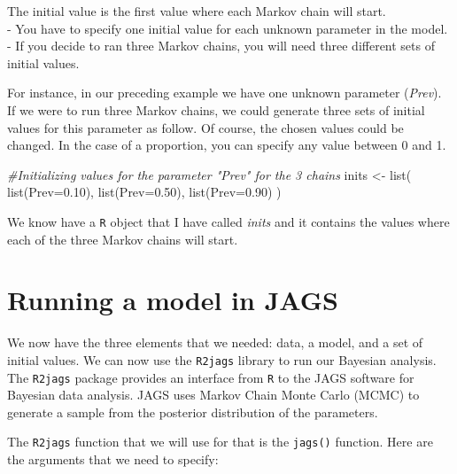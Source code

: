 \documentclass[
]{book}
\newenvironment{Shaded}{\begin{snugshade}}{\end{snugshade}}
\newcommand{\AttributeTok}[1]{\textcolor[rgb]{0.77,0.63,0.00}{#1}}
\newcommand{\CommentTok}[1]{\textcolor[rgb]{0.56,0.35,0.01}{\textit{#1}}}
\newcommand{\FloatTok}[1]{\textcolor[rgb]{0.00,0.00,0.81}{#1}}
\newcommand{\FunctionTok}[1]{\textcolor[rgb]{0.00,0.00,0.00}{#1}}
\newcommand{\NormalTok}[1]{#1}
\newcommand{\OtherTok}[1]{\textcolor[rgb]{0.56,0.35,0.01}{#1}}
\begin{document}
The initial value is the first value where each Markov chain will
start.\\
- You have to specify one initial value for each unknown parameter in
the model.\\
- If you decide to ran three Markov chains, you will need three
different sets of initial values.

For instance, in our preceding example we have one unknown parameter
(\emph{Prev}). If we were to run three Markov chains, we could generate
three sets of initial values for this parameter as follow. Of course,
the chosen values could be changed. In the case of a proportion, you can
specify any value between 0 and 1.

\begin{Shaded}
\begin{Highlighting}[]
\CommentTok{\#Initializing values for the parameter "Prev" for the 3 chains}
\NormalTok{inits }\OtherTok{\textless{}{-}} \FunctionTok{list}\NormalTok{(}
  \FunctionTok{list}\NormalTok{(}\AttributeTok{Prev=}\FloatTok{0.10}\NormalTok{),}
  \FunctionTok{list}\NormalTok{(}\AttributeTok{Prev=}\FloatTok{0.50}\NormalTok{),}
  \FunctionTok{list}\NormalTok{(}\AttributeTok{Prev=}\FloatTok{0.90}\NormalTok{)}
\NormalTok{  )}
\end{Highlighting}
\end{Shaded}

We know have a \texttt{R} object that I have called \emph{inits} and it
contains the values where each of the three Markov chains will start.

\hypertarget{running-a-model-in-jags}{%
\section{Running a model in JAGS}\label{running-a-model-in-jags}}

We now have the three elements that we needed: data, a model, and a set
of initial values. We can now use the \texttt{R2jags} library to run our
Bayesian analysis. The \texttt{R2jags} package provides an interface
from \texttt{R} to the JAGS software for Bayesian data analysis. JAGS
uses Markov Chain Monte Carlo (MCMC) to generate a sample from the
posterior distribution of the parameters.

The \texttt{R2jags} function that we will use for that is the
\texttt{jags()} function. Here are the arguments that we need to
specify:
\end{document}

